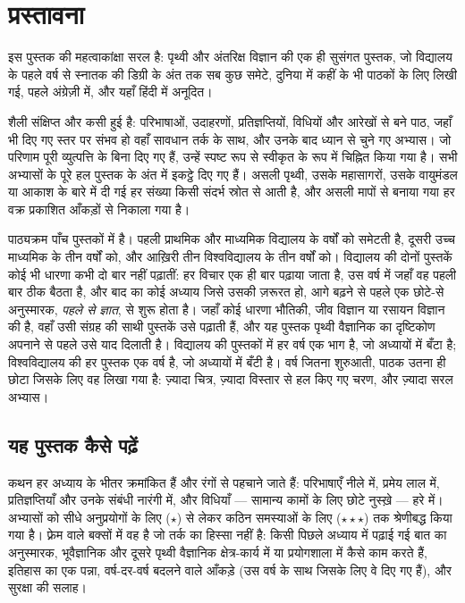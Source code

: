 \chapter{प्रस्तावना}

इस पुस्तक की महत्वाकांक्षा सरल है: पृथ्वी और अंतरिक्ष विज्ञान की एक ही सुसंगत पुस्तक, जो
विद्यालय के पहले वर्ष से स्नातक की डिग्री के अंत तक सब कुछ समेटे, दुनिया में कहीं के भी
पाठकों के लिए लिखी गई, पहले अंग्रेज़ी में, और यहाँ हिंदी में अनूदित।

शैली संक्षिप्त और कसी हुई है: परिभाषाओं, उदाहरणों, प्रतिज्ञप्तियों, विधियों और आरेखों से
बने पाठ, जहाँ भी दिए गए स्तर पर संभव हो वहाँ सावधान तर्क के साथ, और उनके बाद ध्यान से चुने
गए अभ्यास। जो परिणाम पूरी व्युत्पत्ति के बिना दिए गए हैं, उन्हें स्पष्ट रूप से स्वीकृत के रूप
में चिह्नित किया गया है। सभी अभ्यासों के पूरे हल पुस्तक के अंत में इकट्ठे दिए गए हैं। असली
पृथ्वी, उसके महासागरों, उसके वायुमंडल या आकाश के बारे में दी गई हर संख्या किसी संदर्भ स्रोत
से आती है, और असली मापों से बनाया गया हर वक्र प्रकाशित आँकड़ों से निकाला गया है।

पाठ्यक्रम पाँच पुस्तकों में है। पहली प्राथमिक और माध्यमिक विद्यालय के वर्षों को समेटती है,
दूसरी उच्च माध्यमिक के तीन वर्षों को, और आख़िरी तीन विश्वविद्यालय के तीन वर्षों को। विद्यालय
की दोनों पुस्तकें कोई भी धारणा कभी दो बार नहीं पढ़ातीं: हर विचार एक ही बार पढ़ाया जाता है,
उस वर्ष में जहाँ वह पहली बार ठीक बैठता है, और बाद का कोई अध्याय जिसे उसकी ज़रूरत हो, आगे
बढ़ने से पहले एक छोटे-से अनुस्मारक, \emph{पहले से ज्ञात}, से शुरू होता है। जहाँ कोई धारणा
भौतिकी, जीव विज्ञान या रसायन विज्ञान की है, वहाँ उसी संग्रह की साथी पुस्तकें उसे पढ़ाती हैं,
और यह पुस्तक पृथ्वी वैज्ञानिक का दृष्टिकोण अपनाने से पहले उसे याद दिलाती है। विद्यालय की
पुस्तकों में हर वर्ष एक भाग है, जो अध्यायों में बँटा है; विश्वविद्यालय की हर पुस्तक एक वर्ष है,
जो अध्यायों में बँटी है। वर्ष जितना शुरुआती, पाठक उतना ही छोटा जिसके लिए वह लिखा गया है:
ज़्यादा चित्र, ज़्यादा विस्तार से हल किए गए चरण, और ज़्यादा सरल अभ्यास।

\section*{यह पुस्तक कैसे पढ़ें}

कथन हर अध्याय के भीतर क्रमांकित हैं और रंगों से पहचाने जाते हैं: परिभाषाएँ नीले में, प्रमेय
लाल में, प्रतिज्ञप्तियाँ और उनके संबंधी नारंगी में, और विधियाँ --- सामान्य कामों के लिए छोटे
नुस्ख़े --- हरे में। अभ्यासों को सीधे अनुप्रयोगों के लिए ($\star$) से लेकर कठिन समस्याओं के
लिए ($\star\star\star$) तक श्रेणीबद्ध किया गया है। फ़्रेम वाले बक्सों में वह है जो तर्क का
हिस्सा नहीं है: किसी पिछले अध्याय में पढ़ाई गई बात का अनुस्मारक, भूवैज्ञानिक और दूसरे पृथ्वी
वैज्ञानिक क्षेत्र-कार्य में या प्रयोगशाला में कैसे काम करते हैं, इतिहास का एक पन्ना, वर्ष-दर-वर्ष
बदलने वाले आँकड़े (उस वर्ष के साथ जिसके लिए वे दिए गए हैं), और सुरक्षा की सलाह।

